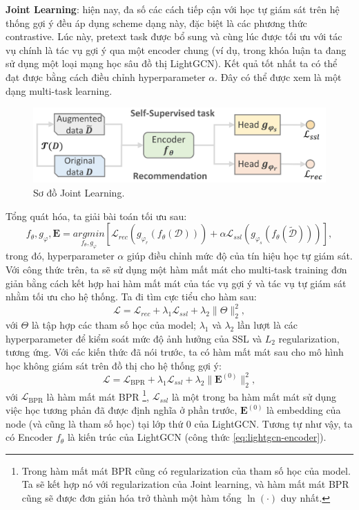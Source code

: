 \textbf{Joint Learning}: hiện nay, đa số các cách tiếp cận với học tự giám sát trên hệ thống gợi ý đều áp dụng scheme dạng này, đặc biệt là các phương thức contrastive. Lúc này, pretext task được bổ sung và cùng lúc được tối ưu với tác vụ chính là tác vụ gợi ý qua một encoder chung (ví dụ, trong khóa luận ta đang sử dụng một loại mạng học sâu đồ thị LightGCN). Kết quả tốt nhất ta có thể đạt được bằng cách điều chỉnh hyperparameter $\alpha$. Đây có thể được xem là một dạng multi-task learning.

\begin{figure}[H]
    \centering
    \includegraphics[scale=0.32]{images/Chapter3/jl_scheme.png}
    \caption{Sơ đồ Joint Learning.}
\end{figure}

\noindent Tổng quát hóa, ta giải bài toán tối ưu sau:
\begin{equation}
    f_\theta, g_\varphi, \mathbf{E} = \underset{f_\theta, g_\varphi}{arg min}\left[\mathcal{L}_\textit{rec}(g_{\varphi_r}(f_\theta(\mathcal{D}))) + \alpha \mathcal{L}_\textit{ssl}(g_{\varphi_s}(f_\theta(\tilde{\mathcal{D}})))\right],
\end{equation}
trong đó, hyperparameter $\alpha$ giúp điều chỉnh mức độ của tín hiệu học tự giám sát. Với công thức trên, ta sẽ sử dụng một hàm mất mát cho multi-task training đơn giản bằng cách kết hợp hai hàm mất mát của tác vụ gợi ý và tác vụ tự giám sát nhằm tối ưu cho hệ thống. Ta đi tìm cực tiểu cho hàm sau:
\begin{equation}
    \mathcal{L} = \mathcal{L}_\textit{rec} + \lambda_1 \mathcal{L}_\textit{ssl} + \lambda_2 \lVert \Theta \rVert_2^2,
\end{equation}
với $\Theta$ là tập hợp các tham số học của model; $\lambda_1$ và $\lambda_2$ lần lượt là các hyperparameter để kiểm soát mức độ ảnh hưởng của SSL và $L_2$ regularization, tương ứng. Với các kiến thức đã nói trước, ta có hàm mất mát sau cho mô hình học không giám sát trên đồ thị cho hệ thống gợi ý:
\begin{equation}
    \mathcal{L} = \mathcal{L}_\text{BPR} + \lambda_1 \mathcal{L}_\textit{ssl} + \lambda_2 \lVert \mathbf{E}^{(0)} \rVert_2^2,
\end{equation}
với $\mathcal{L}_\text{BPR}$ là hàm mất mát BPR \footnote{Trong hàm mất mát BPR cũng có regularization của tham số học của model. Ta sẽ kết hợp nó với regularization của Joint learning, và hàm mất mát BPR cũng sẽ được đơn giản hóa trở thành một hàm tổng $\ln(\cdot)$ duy nhất.}, $\mathcal{L}_\textit{ssl}$ là một trong ba hàm mất mát sử dụng việc học tương phản đã được định nghĩa ở phần trước, $\mathbf{E}^{(0)}$ là embedding của node (và cũng là tham số học) tại lớp thứ 0 của LightGCN. Tương tự như vậy, ta có Encoder $f_\theta$ là kiến trúc của LightGCN (công thức \ref{eq:lightgcn-encoder}).


